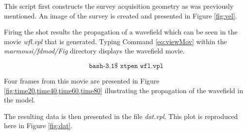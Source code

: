 This script first constructs the survey acquisition geometry as was previously mentioned.  An image of the survey is created and presented
in Figure \ref{fig:vel}.


Firing the shot results the propagation of a wavefield which can be seen in the movie \emph{wfl.vpl} that is generated.  Typing
Command \ref{eq:viewMov} within the \emph{marmousi/fdmod/Fig} directory displays the wavefield movie.

\begin{equation}\label{eq:viewMov} \texttt{bash-3.1\$\ xtpen\ wfl.vpl} \end{equation}

Four frames from this movie are presented in Figure \ref{fig:time20,time40,time60,time80}  illustrating the
propagation of the wavefield in the model.


The resulting data is then presented in the file \emph{dat.vpl}.  This plot is reproduced here in Figure \ref{fig:dat}. 


